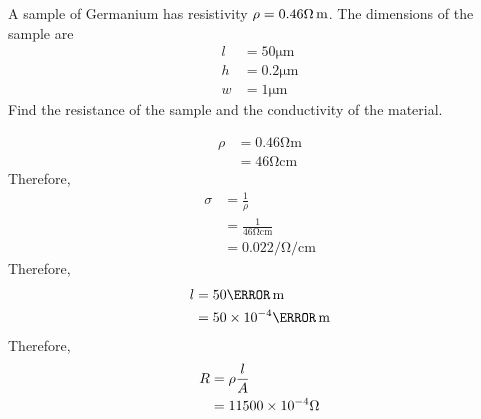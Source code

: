 \documentclass[titlepage, fleqn, a4paper, 12pt, twoside]{article}
\theoremstyle{definition}
\theoremstyle{theorem}
\begin{document}
\begin{question}
	A sample of Germanium has resistivity $\rho = 0.46 \ohm\metre$.
	The dimensions of the sample are
	\begin{align*}
		l & = 50 \si{\micro\metre}  \\
		h & = 0.2 \si{\micro\metre} \\
		w & = 1 \si{\micro\metre}
	\end{align*}
	Find the resistance of the sample and the conductivity of the material.
\end{question}

\begin{solution}
	\begin{align*}
		\rho & = 0.46 \si{\ohm\metre} \\
                     & = 46 \si{\ohm\centi\metre}
	\end{align*}
	Therefore,
	\begin{align*}
		\sigma & = \frac{1}{\rho}                     \\
                       & = \frac{1}{46 \si{\ohm\centi\metre}} \\
                       & = 0.022 \si{\per \ohm \per \centi\metre}
	\end{align*}
	Therefore,
	\begin{align*}
		l & = 50 \micro\metre \\
                  & = 50 \times 10^{-4} \centi\metre
	\end{align*}
	Therefore,
	\begin{align*}
		R & = \rho \frac{l}{A} \\
                  & = 11500 \times 10^{-4} \ohm
	\end{align*}
\end{solution}
\end{document}
